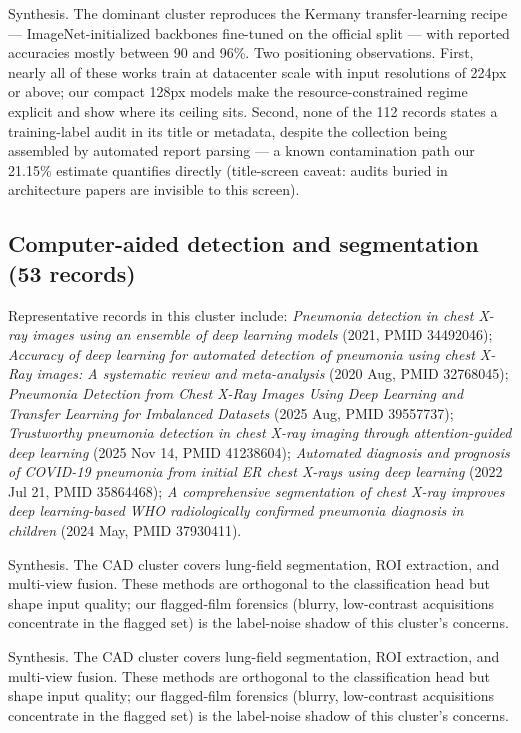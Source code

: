 Synthesis. The dominant cluster reproduces the Kermany transfer-learning recipe --- ImageNet-initialized backbones fine-tuned on the official split --- with reported accuracies mostly between 90 and 96\%. Two positioning observations. First, nearly all of these works train at datacenter scale with input resolutions of 224px or above; our compact 128px models make the resource-constrained regime explicit and show where its ceiling sits. Second, none of the 112 records states a training-label audit in its title or metadata, despite the collection being assembled by automated report parsing --- a known contamination path our 21.15\% estimate quantifies directly (title-screen caveat: audits buried in architecture papers are invisible to this screen).


\subsection*{Computer-aided detection and segmentation (53 records)}
Representative records in this cluster include: \emph{Pneumonia detection in chest X-ray images using an ensemble of deep learning models} (2021, PMID 34492046); \emph{Accuracy of deep learning for automated detection of pneumonia using chest X-Ray images: A systematic review and meta-analysis} (2020 Aug, PMID 32768045); \emph{Pneumonia Detection from Chest X-Ray Images Using Deep Learning and Transfer Learning for Imbalanced Datasets} (2025 Aug, PMID 39557737); \emph{Trustworthy pneumonia detection in chest X-ray imaging through attention-guided deep learning} (2025 Nov 14, PMID 41238604); \emph{Automated diagnosis and prognosis of COVID-19 pneumonia from initial ER chest X-rays using deep learning} (2022 Jul 21, PMID 35864468); \emph{A comprehensive segmentation of chest X-ray improves deep learning-based WHO radiologically confirmed pneumonia diagnosis in children} (2024 May, PMID 37930411).\par

Synthesis. The CAD cluster covers lung-field segmentation, ROI extraction, and multi-view fusion. These methods are orthogonal to the classification head but shape input quality; our flagged-film forensics (blurry, low-contrast acquisitions concentrate in the flagged set) is the label-noise shadow of this cluster's concerns.


Synthesis. The CAD cluster covers lung-field segmentation, ROI extraction, and multi-view fusion. These methods are orthogonal to the classification head but shape input quality; our flagged-film forensics (blurry, low-contrast acquisitions concentrate in the flagged set) is the label-noise shadow of this cluster's concerns.


